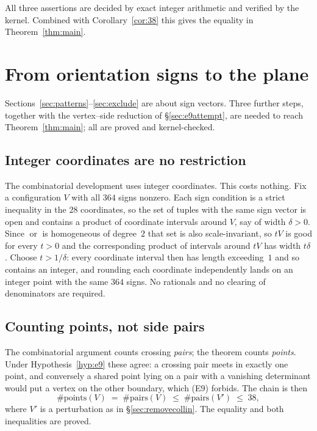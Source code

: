 \documentclass[11pt,a4paper]{article}
\theoremstyle{plain}
\theoremstyle{definition}
\theoremstyle{remark}
\newcommand{\orient}{\operatorname{or}}
\begin{document}
All three assertions are decided by exact integer arithmetic and verified by
the kernel. Combined with Corollary~\ref{cor:38} this gives the equality in
Theorem~\ref{thm:main}.

\section{From orientation signs to the plane}\label{sec:plane}

Sections~\ref{sec:patterns}--\ref{sec:exclude} are about sign vectors. Three
further steps, together with the vertex--side reduction of
\S\ref{sec:e9attempt}, are needed to reach Theorem~\ref{thm:main}; all are
proved and kernel-checked.

\subsection{Integer coordinates are no restriction}

The combinatorial development uses integer coordinates. This costs nothing.
Fix a configuration $V$ with all $364$ signs nonzero. Each sign condition is a
strict inequality in the $28$ coordinates, so the set of tuples with the same
sign vector is open and contains a product of coordinate intervals around $V$,
say of width $\delta>0$. Since $\orient$ is homogeneous of degree~$2$ that set
is also scale-invariant, so $tV$ is good for every $t>0$ and the corresponding
product of intervals around $tV$ has width $t\delta$. Choose $t>1/\delta$: every
coordinate interval then has length exceeding~$1$ and so contains an integer,
and rounding each coordinate independently lands on an integer point with the
same $364$ signs. No rationals and no clearing of denominators are required.

\subsection{Counting points, not side pairs}

The combinatorial argument counts crossing \emph{pairs}; the theorem counts
\emph{points}. Under Hypothesis~\ref{hyp:e9} these agree: a crossing pair meets
in exactly one point, and conversely a shared point lying on a pair with a
vanishing determinant would put a vertex on the other boundary, which (E9)
forbids. The chain is then
\[
  \#\text{points}(V) \;=\; \#\text{pairs}(V)
  \;\le\; \#\text{pairs}(V') \;\le\; 38,
\]
where $V'$ is a perturbation as in \S\ref{sec:removecollin}. The equality and
both inequalities are proved.
\end{document}
